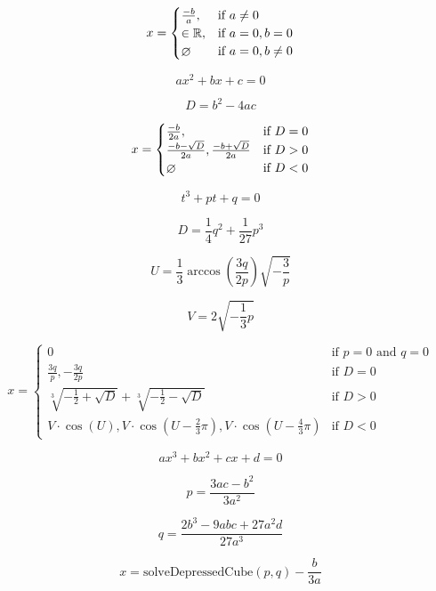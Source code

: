 \documentclass{article}
\begin{document}
\[ x= \begin{cases} \frac{-b}{a}, & \text{if } a\ne0\\ \in\mathbb{R}, & \text{if } a=0,b=0\\ \o & \text{if } a=0,b\ne0 \end{cases} \]
\pagebreak

\[ax^{2}+bx+c=0\]
\pagebreak

\[D=b^{2}-4ac\]
\pagebreak

\[ x= \begin{cases} \frac{-b}{2a}, & \text{if } D=0\\ \frac{-b -\sqrt{D}}{2a}, \frac{-b +\sqrt{D}}{2a} & \text{if } D>0\\ \o & \text{if } D<0 \end{cases} \]
\pagebreak

\[t^{3}+pt+q=0\]
\pagebreak

\[D=\frac{1}{4}q^{2}+\frac{1}{27}p^{3}\]
\pagebreak

\[U=\frac{1}{3}\arccos(\frac{3q}{2p})\sqrt{-\frac{3}{p}}\]
\pagebreak

\[V=2\sqrt{-\frac{1}{3}p}\]
\pagebreak

\[ x= \begin{cases} 0 & \text{if } p=0 \text{ and }q=0\\ \frac{3q}{p}, -\frac{3q}{2p} & \text{if } D=0\\ \sqrt[3]{-\frac{1}{2}+\sqrt{D}} + \sqrt[3]{-\frac{1}{2}-\sqrt{D}} & \text{if } D>0\\ V\cdot \cos(U), V\cdot\cos(U-\frac{2}{3}\pi),V\cdot\cos(U-\frac{4}{3}\pi) & \text{if } D<0 \end{cases} \]
\pagebreak

\[ax^{3}+bx^{2}+cx+d=0\]
\pagebreak

\[p=\frac{3ac-b^{2}}{3a^{2}}\]
\pagebreak

\[q=\frac{2b^{3}-9abc+27a^{2}d}{27a^{3}}\]
\pagebreak

\[x=\text{solveDepressedCube}(p,q)-\frac{b}{3a}\]
\pagebreak
\end{document}
